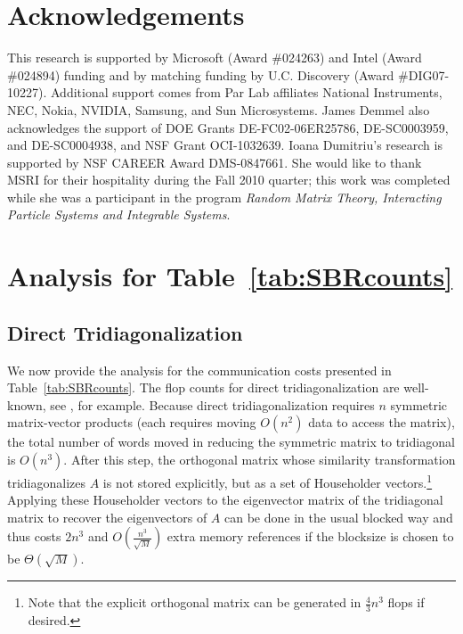 \documentclass{article}
\def\lt{\left}
\def\rt{\right}
\theoremstyle{definition}
\begin{document}
\section{Acknowledgements}
This research is supported by Microsoft (Award \#024263) and Intel (Award \#024894) funding and by matching funding by U.C. Discovery (Award \#DIG07-10227). Additional support comes from Par Lab affiliates National Instruments, NEC, Nokia, NVIDIA, Samsung, and Sun Microsystems.  James Demmel also acknowledges the support of DOE Grants DE-FC02-06ER25786, DE-SC0003959, and DE-SC0004938, and NSF Grant OCI-1032639.  Ioana Dumitriu's research is supported by NSF CAREER Award DMS-0847661. She would like to thank MSRI for their hospitality during the Fall 2010 quarter; this work was completed while she was a participant in the program \emph{Random Matrix Theory, Interacting Particle Systems and Integrable Systems}.




\appendix

\section{Analysis for Table~\ref{tab:SBRcounts}}
\label{app:SBRcounts}

\subsection{Direct Tridiagonalization}

We now provide the analysis for the communication costs presented in Table~\ref{tab:SBRcounts}.  The flop counts for direct tridiagonalization are well-known, see \cite{BCCDDDHHPSWW:96}, for example.  Because direct tridiagonalization requires $n$ symmetric matrix-vector products (each requires moving $O(n^2)$ data to access the matrix), the total number of words moved in reducing the symmetric matrix to tridiagonal is $O(n^3)$.  After this step, the orthogonal matrix whose similarity transformation tridiagonalizes $A$ is not stored explicitly, but as a set of Householder vectors.\footnote{Note that the explicit orthogonal matrix can be generated in $\frac 43 n^3$ flops if desired.}  Applying these Householder vectors to the eigenvector matrix of the tridiagonal matrix to recover the eigenvectors of $A$ can be done in the usual blocked way and thus costs $2n^3$ and $O\lt(\frac{n^3}{\sqrt M}\rt)$ extra memory references if the blocksize is chosen to be $\Theta(\sqrt M)$.  
\end{document}
